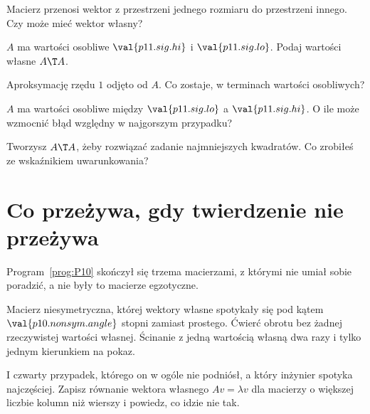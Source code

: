 \begin{quiz}
\item Macierz przenosi wektor z przestrzeni jednego rozmiaru do przestrzeni
  innego. Czy może mieć wektor własny? 
\item $A$ ma wartości osobliwe $\val{p11.sig.hi}$ i $\val{p11.sig.lo}$. Podaj
  wartości własne $A\T A$. 
\item Aproksymację rzędu $1$ odjęto od $A$. Co zostaje, w terminach wartości
  osobliwych? 
\item $A$ ma wartości osobliwe między $\val{p11.sig.lo}$ a
  $\val{p11.sig.hi}$. O ile może wzmocnić błąd względny w najgorszym
  przypadku? 
\item Tworzysz $A\T A$, żeby rozwiązać zadanie najmniejszych kwadratów. Co
  zrobiłeś ze wskaźnikiem uwarunkowania? 
\end{quiz}

\section{Co przeżywa, gdy twierdzenie nie przeżywa}
\label{sec:P11-svd}

\begin{fr}
Program~\ref{prog:P10} skończył się trzema macierzami, z którymi nie umiał
sobie poradzić, a nie były to macierze egzotyczne.

Macierz niesymetryczna, której wektory własne spotykały się pod kątem
$\val{p10.nonsym.angle}$ stopni zamiast prostego. Ćwierć obrotu bez żadnej
rzeczywistej wartości własnej. Ścinanie z jedną wartością własną dwa razy i
tylko jednym kierunkiem na pokaz.

I czwarty przypadek, którego on w ogóle nie podniósł, a który inżynier spotyka
najczęściej. Zapisz równanie wektora własnego $Av = \lambda v$ dla macierzy o
większej liczbie kolumn niż wierszy i powiedz, co idzie nie tak.
\dotline
\nextframe
\end{fr}

